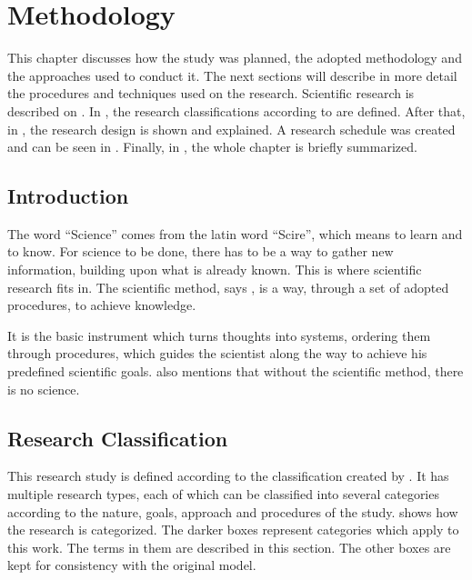 \chapter{Methodology}\label{methodology}

This chapter discusses how the study was planned, the adopted methodology and the approaches used to conduct it. The next sections will describe in more detail the procedures and techniques used on the research. Scientific research is described on . In , the research classifications according to  are defined. After that, in , the research design is shown and explained. A research schedule was created and can be seen in . Finally, in , the whole chapter is briefly summarized.

\section{Introduction}\label{sec:met-1}

The word ``Science'' comes from the latin word ``Scire'', which means to learn and to know. For science to be done, there has to be a way to gather new information, building upon what is already known. This is where scientific research fits in. The scientific method, says , is a way, through a set of adopted procedures, to achieve knowledge.

It is the basic instrument which turns thoughts into systems, ordering them through procedures, which guides the scientist along the way to achieve his predefined scientific goals.  also mentions that without the scientific method, there is no science.

\section{Research Classification}\label{sec:met-2}

This research study is defined according to the classification created by . It has multiple research types, each of which can be classified into several categories according to the nature, goals, approach and procedures of the study.  shows how the research is categorized. The darker boxes represent categories which apply to this work. The terms in them are described in this section. The other boxes are kept for consistency with the original model.

